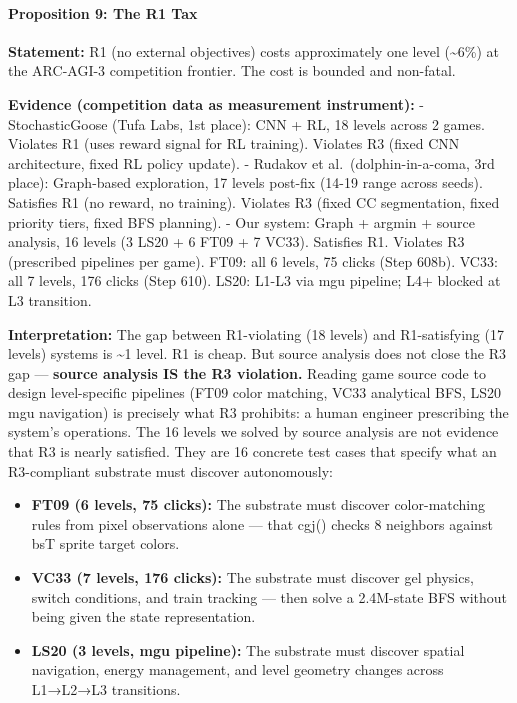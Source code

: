 \documentclass[
  11pt,
]{article}
\providecommand{\tightlist}{%
  \setlength{\itemsep}{0pt}\setlength{\parskip}{0pt}}
\begin{document}
\paragraph{Proposition 9: The R1 Tax}\label{proposition-9-the-r1-tax}

\textbf{Statement:} R1 (no external objectives) costs approximately one
level (\textasciitilde6\%) at the ARC-AGI-3 competition frontier. The
cost is bounded and non-fatal.

\textbf{Evidence (competition data as measurement instrument):} -
StochasticGoose (Tufa Labs, 1st place): CNN + RL, 18 levels across 2
games. Violates R1 (uses reward signal for RL training). Violates R3
(fixed CNN architecture, fixed RL policy update). - Rudakov et
al.~(dolphin-in-a-coma, 3rd place): Graph-based exploration, 17 levels
post-fix (14-19 range across seeds). Satisfies R1 (no reward, no
training). Violates R3 (fixed CC segmentation, fixed priority tiers,
fixed BFS planning). - Our system: Graph + argmin + source analysis, 16
levels (3 LS20 + 6 FT09 + 7 VC33). Satisfies R1. Violates R3 (prescribed
pipelines per game). FT09: all 6 levels, 75 clicks (Step 608b). VC33:
all 7 levels, 176 clicks (Step 610). LS20: L1-L3 via mgu pipeline; L4+
blocked at L3 transition.

\textbf{Interpretation:} The gap between R1-violating (18 levels) and
R1-satisfying (17 levels) systems is \textasciitilde1 level. R1 is
cheap. But source analysis does not close the R3 gap --- \textbf{source
analysis IS the R3 violation.} Reading game source code to design
level-specific pipelines (FT09 color matching, VC33 analytical BFS, LS20
mgu navigation) is precisely what R3 prohibits: a human engineer
prescribing the system's operations. The 16 levels we solved by source
analysis are not evidence that R3 is nearly satisfied. They are 16
concrete test cases that specify what an R3-compliant substrate must
discover autonomously:

\begin{itemize}
\tightlist
\item
  \textbf{FT09 (6 levels, 75 clicks):} The substrate must discover
  color-matching rules from pixel observations alone --- that cgj()
  checks 8 neighbors against bsT sprite target colors.
\item
  \textbf{VC33 (7 levels, 176 clicks):} The substrate must discover gel
  physics, switch conditions, and train tracking --- then solve a
  2.4M-state BFS without being given the state representation.
\item
  \textbf{LS20 (3 levels, mgu pipeline):} The substrate must discover
  spatial navigation, energy management, and level geometry changes
  across L1→L2→L3 transitions.
\end{itemize}
\end{document}
